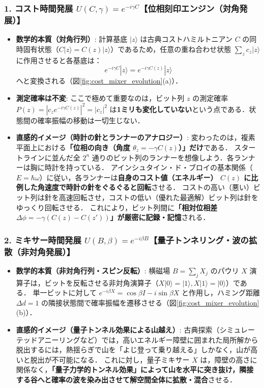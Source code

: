 \documentclass[11pt,a4paper,oneside,openany]{ltjsbook}
\theoremstyle{definition}
\theoremstyle{plain}
\theoremstyle{remark}
\newcommand{\ket}[1]{|#1\rangle}
\begin{document}
\subsubsection*{1. コスト時間発展 $U(C, \gamma) = e^{-i\gamma C}$【位相刻印エンジン（対角発展）】}
\begin{itemize}
    \item \textbf{数学的本質（対角行列）}: 計算基底 $\ket{z}$ は古典コストハミルトニアン $C$ の同時固有状態（$C\ket{z} = C(z)\ket{z}$）であるため，任意の重ね合わせ状態 $\sum_z c_z \ket{z}$ に作用させると各基底は：
    \begin{equation}
        e^{-i \gamma C} \ket{z} = e^{-i \gamma C(z)} \ket{z}
    \end{equation}
    へと変換される（図\ref{fig:cost_mixer_evolution}(a)）．
    \item \textbf{測定確率は不変}: ここで極めて重要なのは，ビット列 $z$ の測定確率 $P(z) = |c_z e^{-i \gamma C(z)}|^2 = |c_z|^2$ は\textbf{1ミリも変化していない}という点である．状態間の確率振幅の移動は一切生じない．
    \item \textbf{直感的イメージ（時計の針とランナーのアナロジー）}:
    変わったのは，複素平面上における\textbf{「位相の向き（角度 $\theta_z = -\gamma C(z)$）」だけ}である．
    スタートラインに並んだ全 $2^n$ 通りのビット列のランナーを想像しよう．各ランナーは胸に時計を持っている．
    アインシュタイン・ド・ブロイの基本関係（$E = \hbar \omega$）に従い，各ランナーは\textbf{自身のコスト値（エネルギー） $C(z)$ に比例した角速度で時計の針をぐるぐると回転}させる．
    コストの高い（悪い）ビット列は針を高速回転させ，コストの低い（優れた最適解）ビット列は針をゆっくり回転させる．
    これにより，ビット列間に\textbf{「相対位相差 $\Delta \phi = -\gamma(C(z) - C(z'))$」が厳密に記録・記憶}される．
\end{itemize}

\subsubsection*{2. ミキサー時間発展 $U(B, \beta) = e^{-i\beta B}$【量子トンネリング・波の拡散（非対角発展）】}
\begin{itemize}
    \item \textbf{数学的本質（非対角行列・スピン反転）}: 横磁場 $B = \sum_j X_j$ のパウリ $X$ 演算子は，ビットを反転させる非対角演算子（$X\ket{0}=\ket{1}, X\ket{1}=\ket{0}$）である．
    単一ビットに対して $e^{-i\beta X} = \cos\beta I - i\sin\beta X$ と作用し，ハミング距離 $\Delta d = 1$ の隣接状態間で確率振幅を遷移させる（図\ref{fig:cost_mixer_evolution}(b)）．
    \item \textbf{直感的イメージ（量子トンネル効果による山越え）}:
    古典探索（シミュレーテッドアニーリングなど）では，高いエネルギー障壁に囲まれた局所解から脱出するには，熱揺らぎで山を「よじ登って乗り越える」しかなく，山が高いと脱出が不可能になる．
    これに対し，量子ミキサー $X$ は，障壁の高さに関係なく，\textbf{「量子力学的トンネル効果」によって山を水平に突き抜け，隣接する谷へと確率の波を染み出させて解空間全体に拡散・混合}させる．
\end{itemize}
\end{document}
